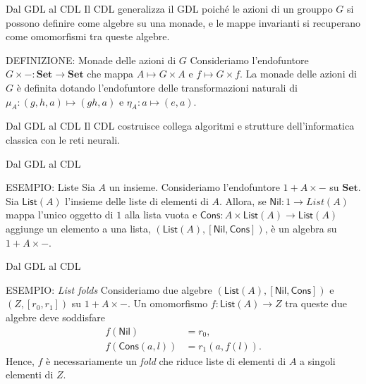 \documentclass{beamer}
\begin{document}
\begin{frame}{Dal GDL al CDL}
    Il CDL generalizza il GDL poiché le azioni di un grouppo $G$ si possono definire come algebre su una monade, e le mappe invarianti si recuperano come omomorfismi tra queste algebre.

    \vspace{5mm}

    \begin{block}{DEFINIZIONE: Monade delle azioni di $G$}
        Consideriamo l'endofuntore $G \times -: \mathbf{Set} \to \mathbf{Set}$ che mappa $A \mapsto G \times A$ e $f \mapsto G \times f$.
        La monade delle azioni di $G$ è definita dotando l'endofuntore delle transformazioni naturali di $\mu_A: (g,h,a) \mapsto (gh,a)$ e  $\eta_A: a \mapsto (e,a)$.
    \end{block}
\end{frame}

\begin{frame}{Dal GDL al CDL}
    Il CDL costruisce collega algoritmi e strutture dell'informatica classica con le reti neurali.
\end{frame}

\begin{frame}{Dal GDL al CDL}
    \begin{block}{ESEMPIO: Liste}
        Sia $A$ un insieme. Consideriamo l'endofuntore $1 + A \times -$ su $\mathbf{Set}$. Sia $\mathsf{List}(A)$ l'insieme delle liste di elementi di $A$. Allora, se $\mathsf{Nil}: 1 \to {List}(A)$ mappa l'unico oggetto di $1$ alla lista vuota e $\mathsf{Cons}: A \times \mathsf{List}(A) \to \mathsf{List}(A)$ aggiunge un elemento a una lista, $(\mathsf{List}(A), [\mathsf{Nil}, \mathsf{Cons}])$, è un algebra su $1 + A \times -$.
    \end{block}
\end{frame}

\begin{frame}{Dal GDL al CDL}
    \begin{block}{ESEMPIO: \textit{List folds}}
        Consideriamo due algebre $(\mathsf{List}(A), [\mathsf{Nil}, \mathsf{Cons}])$ e $(Z, [r_0,r_1])$ su $1 + A \times -$. Un omomorfismo $f: \mathsf{List}(A) \to Z$ tra queste due algebre deve soddisfare 
        \begin{align*}
            f(\mathsf{Nil}) &= r_0,\\
            f(\mathsf{Cons}(a,l)) &= r_1(a,f(l)). 
        \end{align*}
        Hence, $f$ è necessariamente un \textit{fold} che riduce liste di elementi di $A$ a singoli elementi di $Z$.
    \end{block}
\end{frame}
\end{document}
